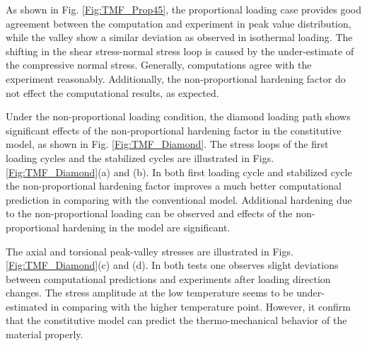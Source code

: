 \documentclass[preprint,5p,twocolumn,11pt,sort&compress]{elsarticle}
\begin{document}
As shown in Fig. \ref{Fig:TMF_Prop45}, the proportional loading case provides good agreement between the computation and experiment in peak value distribution, while the valley show a similar deviation as observed in isothermal loading. The shifting in the shear stress-normal stress loop is caused by the under-estimate of the compressive normal stress. Generally, computations agree with the experiment reasonably. Additionally, the non-proportional hardening factor do not effect the computational results, as expected.

Under the non-proportional loading condition, the diamond loading path shows significant effects of the non-proportional hardening factor  in the constitutive model, as shown in Fig. \ref{Fig:TMF_Diamond}. The stress loops of the first loading cycles and the stabilized cycles are illustrated in Figs. \ref{Fig:TMF_Diamond}(a) and (b). In both first loading cycle and stabilized cycle the non-proportional hardening factor improves a much better computational prediction in comparing with the conventional model. Additional hardening due to the non-proportional loading can be observed and effects of the non-proportional hardening in the model are significant.

The axial and torsional peak-valley stresses are illustrated in  Figs. \ref{Fig:TMF_Diamond}(c) and (d).
In both tests one observes slight deviations between computational predictions and experiments after  loading direction changes. The stress amplitude at the low temperature seems to be under-estimated in comparing with the higher temperature point. However, it confirm that the constitutive model can predict the thermo-mechanical behavior of the material properly. 

\end{document}
